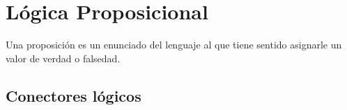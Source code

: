 \documentclass[a4paper, twoside]{article}
\newcommand{\rutapaquetes}{./paquetes-apunte}
\begin{document}
\maketitle

\tableofcontents

 

\section{Lógica Proposicional}
Una proposición es un enunciado del lenguaje al que tiene sentido asignarle un 
valor de verdad o falsedad.

\subsection{Conectores lógicos}
\end{document}
